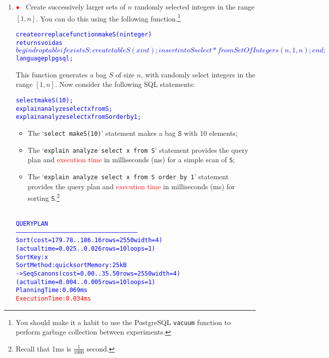 \documentclass{article}
\newcommand{\redbullet}{$\textcolor{red}{\bullet}$}
\newcommand{\blue}[1]{{\color{blue}#1}}
\begin{document}
\begin{enumerate}[resume]
\item \redbullet\ \label{sortTime}   Create successively larger sets of $n$ randomly selected integers in the range $[1,n]$.     You can do this  using the following function.\footnote{You should make it a habit to use the PostgreSQL \blue{\tt vacuum} function to perform garbage collection between experiments.} 

{\small \begin{alltt}
\textcolor{blue}{create or replace function makeS (n integer)
returns void as
$$
begin 
    drop table if exists S;
    create table S (x int);
    insert into S select * from SetOfIntegers(n,1,n);
end;    
$$ language plpgsql;}
\end{alltt}}
This function generates a bag $S$ of size $n$, with randomly select integers in the range $[1,n]$.
Now consider the following SQL statements:
\begin{center}
\begin{alltt}
\textcolor{blue}{select makeS(10);
explain analyze {select x from S;}
explain analyze {select x from S order by 1;}}
\end{alltt}
\end{center}

\begin{itemize}
\item The `\blue{\tt select makeS(10)}' statement makes a bag $\mathtt{S}$ with 10 elements;
\item The `\blue{\tt explain analyze {select x from S}}' statement provides the query plan and \textcolor{red}{execution time} in milliseconds (ms) for a simple scan of {\tt S};
\item The `\blue{\tt explain analyze {select x from S order by 1}}' statement provides the query plan and \textcolor{red}{execution time} in milliseconds (ms) for sorting {\tt S}.\footnote{Recall that 1ms is $\frac{1}{1000}$ second.}
\end{itemize}

\begin{center}
{\footnotesize
\begin{alltt}
\textcolor{blue}{
    QUERY PLAN                                              
------------------------------------------------------------------------------------------------------
 Sort  (cost=179.78..186.16 rows=2550 width=4) (actual time=0.025..0.026 rows=10 loops=1)
   Sort Key: x
   Sort Method: quicksort  Memory: 25kB
   ->  Seq Scan on s  (cost=0.00..35.50 rows=2550 width=4) (actual time=0.004..0.005 rows=10 loops=1)
 Planning Time: 0.069 ms
 \textcolor{red}{Execution Time: 0.034 ms}}
\end{alltt}
}
\end{center}


\end{enumerate}
\end{document}
